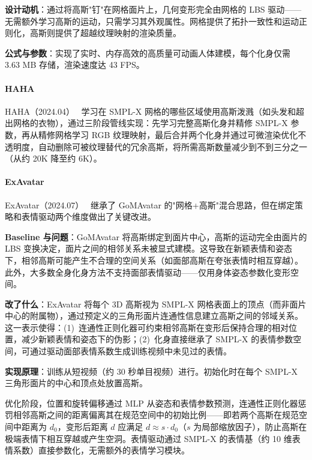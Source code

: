 \textbf{设计动机}：通过将高斯"钉"在网格面片上，几何变形完全由网格的 LBS 驱动——无需额外学习高斯的运动，只需学习其外观属性。网格提供了拓扑一致性和运动正则化，高斯则提供了超越纹理映射的渲染质量。

\textbf{公式与参数}：实现了实时、内存高效的高质量可动画人体建模，每个化身仅需 3.63 MB 存储，渲染速度达 43 FPS。

\paragraph{HAHA}

HAHA（2024.04）~\cite{2404_01053} 学习在 SMPL-X 网格的哪些区域使用高斯泼溅（如头发和超出网格的衣物），通过三阶段管线实现：先学习完整高斯化身并精修 SMPL-X 参数，再从精修网格学习 RGB 纹理映射，最后合并两个化身并通过可微渲染优化不透明度，自动删除可被纹理替代的冗余高斯，将所需高斯数量减少到不到三分之一（从约 20K 降至约 6K）。

\paragraph{ExAvatar}

ExAvatar（2024.07）~\cite{2407_21686} 继承了 GoMAvatar 的"网格+高斯"混合思路，但在绑定策略和表情驱动两个维度做出了关键改进。

\textbf{Baseline 与问题}：GoMAvatar 将高斯绑定到面片中心，高斯的运动完全由面片的 LBS 变换决定，面片之间的相邻关系未被显式建模。这导致在新颖表情和姿态下，相邻高斯可能产生不合理的空间关系（如面部高斯在夸张表情时相互穿越）。此外，大多数全身化身方法不支持面部表情驱动——仅用身体姿态参数化变形空间。

\textbf{改了什么}：ExAvatar 将每个 3D 高斯视为 SMPL-X 网格表面上的顶点（而非面片中心的附属物），通过预定义的三角形面片连通性信息建立高斯之间的邻域关系。这一表示使得：(1)~连通性正则化器可约束相邻高斯在变形后保持合理的相对位置，减少新颖表情和姿态下的伪影；(2)~化身直接继承了 SMPL-X 的表情参数空间，可通过驱动面部表情系数生成训练视频中未见过的表情。

\textbf{实现原理}：训练从短视频（约 30 秒单目视频）进行。初始化时在每个 SMPL-X 三角形面片的中心和顶点处放置高斯。

优化阶段，位置和旋转偏移通过 MLP 从姿态和表情参数预测，连通性正则化器惩罚相邻高斯之间的距离偏离其在规范空间中的初始比例——即若两个高斯在规范空间中距离为 $d_0$，变形后距离 $d$ 应满足 $d \approx s \cdot d_0$（$s$ 为局部缩放因子），防止高斯在极端表情下相互穿越或产生空洞。表情驱动通过 SMPL-X 的表情基（约 10 维表情系数）直接参数化，无需额外的表情学习模块。

